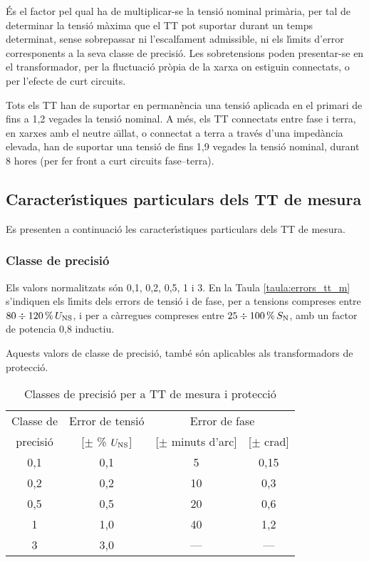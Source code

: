  \'{E}s el factor pel qual ha de
multiplicar-se la tensi\'{o} nominal prim\`{a}ria, per tal de determinar la
tensi\'{o} m\`{a}xima que el TT pot suportar durant un temps determinat,
sense sobrepassar ni l'escalfament admissible, ni els l\'{\i}mits d'error
corresponents a la seva classe de precisi\'{o}. Les sobretensions poden
presentar-se en el transformador,  per la fluctuaci\'{o}
    pr\`{o}pia de la xarxa on estiguin connectats, o per l'efecte de curt
    circuits.

    Tots els  TT han de suportar   en perman\`{e}ncia una tensi\'{o} aplicada en
    el primari de fins a  1,2 vegades la tensi\'{o} nominal. A m\'{e}s, els TT
connectats entre fase i terra, en xarxes amb el neutre a\"{\i}llat, o
connectat a terra a trav\'{e}s d'una imped\`{a}ncia elevada, han de suportar
    una tensi\'{o} de fins 1,9 vegades la tensi\'{o} nominal, durant 8 hores (per fer front a
    curt circuits fase--terra).


\subsection{Caracter\'{\i}stiques particulars dels TT de mesura}

Es presenten a continuaci\'{o} les caracter\'{\i}stiques particulars dels TT
de mesura.

\subsubsection{Classe de precisi\'{o}}

 Els valors normalitzats s\'{o}n
0,1, 0,2, 0,5, 1 i 3. En la Taula \vref{taula:errors_tt_m} s'indiquen els l\'{\i}mits dels
errors de tensi\'{o} i  de fase, per a tensions compreses entre $80 \div 120\mathrm{\,\%} \,U_\mathrm{NS}$,
i per a c\`{a}rregues compreses entre  $25 \div 100\mathrm{\,\%} \,S_\mathrm{N}$, amb un factor de potencia
0,8 inductiu.

Aquests valors de classe de precisi\'{o}, tamb\'{e} s\'{o}n aplicables als
transformadors de protecci\'{o}.

\begin{table}[htb]
   \caption{\label{taula:errors_tt_m} Classes de precisi\'{o} per a TT de mesura i protecci\'{o}}
   \begin{center}\begin{tabular}{cccc}
   \toprule[1pt]
   Classe de & Error de tensi\'{o} & \multicolumn{2}{c}{Error de fase} \\
   \cmidrule(rl){3-4}
   precisi\'{o} &  [$\pm$ \% $U_\mathrm{NS}$] & [$\pm$ minuts d'arc]  & [$\pm$ crad] \\
   \midrule
   0,1 & 0,1 & 5  & 0,15 \\
   0,2 & 0,2 & 10 & 0,3 \\
   0,5 & 0,5 & 20 & 0,6 \\
   1 & 1,0 & 40 & 1,2 \\
   3 & 3,0 &  ---  & --- \\
   \bottomrule[1pt]
   \end{tabular} \end{center}
\end{table}

